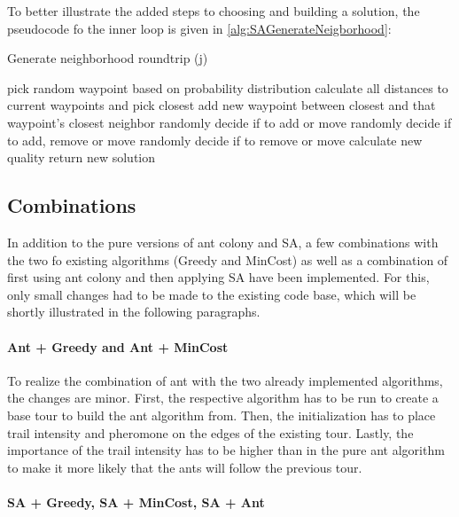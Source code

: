 To better illustrate the added steps to choosing and building a solution, the pseudocode fo the inner loop is given in \ref{alg:SAGenerateNeigborhood}:



\begin{breakablealgorithm}
	\caption{Generate neighborhood roundtrip (j)}
	\label{alg:SAGenerateNeigborhood}
	\begin{algorithmic}[1]
		\STATE pick random waypoint based on probability distribution
		\STATE calculate all distances to current waypoints and pick closest
		\STATE add new waypoint between closest and that waypoint's closest neighbor
		\ELSE {}
		\STATE randomly decide if to add or move
		\ELSE {}
		\STATE randomly decide if to add, remove or move
		\ELSE 
		\STATE randomly decide if to remove or move
		\ENDIF
		\ENDIF
		\ENDIF
		\STATE calculate new quality
		\STATE return new solution
	\end{algorithmic}
\end{breakablealgorithm}


\subsection{Combinations}
\label{subsec:algoCombinations}

In addition to the pure versions of ant colony and SA, a few combinations with the two fo existing algorithms (Greedy and MinCost) as well as a combination of first using ant colony and then applying SA have been implemented.
For this, only small changes had to be made to the existing code base, which will be shortly illustrated in the following paragraphs.

\paragraph{Ant + Greedy and Ant + MinCost}

To realize the combination of ant with the two already implemented algorithms, the changes are minor.
First, the respective algorithm has to be run to create a base tour to build the ant algorithm from.
Then, the initialization has to place trail intensity and pheromone on the edges of the existing tour.
Lastly, the importance of the trail intensity has to be higher than in the pure ant algorithm to make it more likely that the ants will follow the previous tour.


\paragraph{SA + Greedy, SA + MinCost, SA + Ant}

